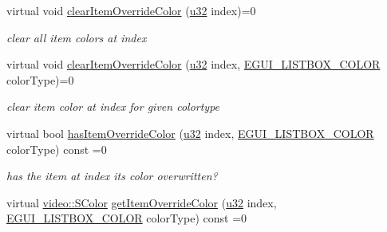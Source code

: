 \begin{DoxyCompactItemize}
\mbox{\label{classirr_1_1gui_1_1IGUIListBox_aca681d4d4814cde0678109e3bce2471e}} 
virtual void \hyperlink{classirr_1_1gui_1_1IGUIListBox_aca681d4d4814cde0678109e3bce2471e}{clear\+Item\+Override\+Color} (\hyperlink{namespaceirr_a0416a53257075833e7002efd0a18e804}{u32} index)=0
\begin{DoxyCompactList}\small\item\em clear all item colors at index \end{DoxyCompactList}\item 
\mbox{\label{classirr_1_1gui_1_1IGUIListBox_aa0bb8fd96be94e8de5d4496b7d5e2ffd}} 
virtual void \hyperlink{classirr_1_1gui_1_1IGUIListBox_aa0bb8fd96be94e8de5d4496b7d5e2ffd}{clear\+Item\+Override\+Color} (\hyperlink{namespaceirr_a0416a53257075833e7002efd0a18e804}{u32} index, \hyperlink{namespaceirr_1_1gui_a7da705f0a0b4aa5385e6842adf409cb6}{E\+G\+U\+I\+\_\+\+L\+I\+S\+T\+B\+O\+X\+\_\+\+C\+O\+L\+OR} color\+Type)=0
\begin{DoxyCompactList}\small\item\em clear item color at index for given colortype \end{DoxyCompactList}\item 
\mbox{\label{classirr_1_1gui_1_1IGUIListBox_a8399578154c3cbfcdd23f3b7009c448d}} 
virtual bool \hyperlink{classirr_1_1gui_1_1IGUIListBox_a8399578154c3cbfcdd23f3b7009c448d}{has\+Item\+Override\+Color} (\hyperlink{namespaceirr_a0416a53257075833e7002efd0a18e804}{u32} index, \hyperlink{namespaceirr_1_1gui_a7da705f0a0b4aa5385e6842adf409cb6}{E\+G\+U\+I\+\_\+\+L\+I\+S\+T\+B\+O\+X\+\_\+\+C\+O\+L\+OR} color\+Type) const =0
\begin{DoxyCompactList}\small\item\em has the item at index its color overwritten? \end{DoxyCompactList}\item 
\mbox{\label{classirr_1_1gui_1_1IGUIListBox_a504c669eae86307521b643288c4ef196}} 
virtual \hyperlink{classirr_1_1video_1_1SColor}{video\+::\+S\+Color} \hyperlink{classirr_1_1gui_1_1IGUIListBox_a504c669eae86307521b643288c4ef196}{get\+Item\+Override\+Color} (\hyperlink{namespaceirr_a0416a53257075833e7002efd0a18e804}{u32} index, \hyperlink{namespaceirr_1_1gui_a7da705f0a0b4aa5385e6842adf409cb6}{E\+G\+U\+I\+\_\+\+L\+I\+S\+T\+B\+O\+X\+\_\+\+C\+O\+L\+OR} color\+Type) const =0

\end{DoxyCompactItemize}
